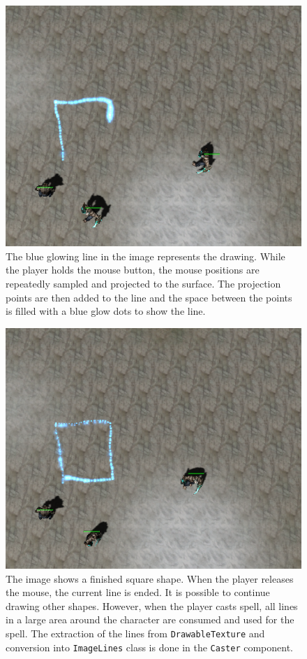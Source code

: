 \begin{figure}[p]
\centering
\includegraphics[width=.9\linewidth]{ext/scr/komix2.png}
\caption{The blue glowing line in the image represents the drawing. While the player holds the mouse button, the mouse positions are repeatedly sampled and projected to the surface. The projection points are then added to the line and the space between the points is filled with a blue glow dots to show the line. }
\label{fig:drawing}
\end{figure}

\begin{figure}[p]
\centering
\includegraphics[width=.9\linewidth]{ext/scr/komix3.png}
\caption{The image shows a finished square shape. When the player releases the mouse, the current line is ended. It is possible to continue drawing other shapes. However, when the player casts spell, all lines in a large area around the character are consumed and used for the spell. The extraction of the lines from \texttt{DrawableTexture} and conversion into \texttt{ImageLines} class is done in the \texttt{Caster} component. }
\label{fig:square}
\end{figure}

